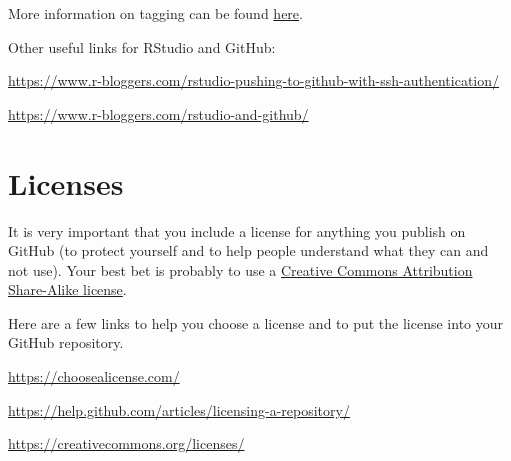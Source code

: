 \documentclass[12pt,letterpaper]{article} %
\begin{document}
More information on tagging can be found \href{https://git-scm.com/book/en/v2/Git-Basics-Tagging}{here}.

\vspace{0.8cm}

Other useful links for RStudio and GitHub:

\url{https://www.r-bloggers.com/rstudio-pushing-to-github-with-ssh-authentication/}

\url{https://www.r-bloggers.com/rstudio-and-github/}

\section*{Licenses}
It is very important that you include a license for anything you publish on GitHub (to protect yourself and to help people understand what they can and not use). Your best bet is probably to use a \href{https://creativecommons.org/licenses/by-sa/3.0/deed.en}{Creative Commons Attribution Share-Alike license}.

Here are a few links to help you choose a license and to put the license into your GitHub repository.

\url{https://choosealicense.com/}

\url{https://help.github.com/articles/licensing-a-repository/}

\url{https://creativecommons.org/licenses/}
\end{document}
